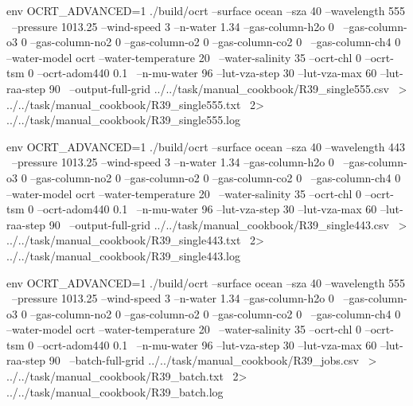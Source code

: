 \noindent\begin{minipage}{\linewidth}
\begin{ManualCode}

env OCRT_ADVANCED=1 ./build/ocrt --surface ocean --sza 40 --wavelength 555 \
  --pressure 1013.25 --wind-speed 3 --n-water 1.34 --gas-column-h2o 0 \
  --gas-column-o3 0 --gas-column-no2 0 --gas-column-o2 0 --gas-column-co2 0 \
  --gas-column-ch4 0 --water-model ocrt --water-temperature 20 \
  --water-salinity 35 --ocrt-chl 0 --ocrt-tsm 0 --ocrt-adom440 0.1 \
  --n-mu-water 96 --lut-vza-step 30 --lut-vza-max 60 --lut-raa-step 90 \
  --output-full-grid ../../task/manual_cookbook/R39_single555.csv \
  > ../../task/manual_cookbook/R39_single555.txt \
  2> ../../task/manual_cookbook/R39_single555.log

\end{ManualCode}
\end{minipage}\par

\noindent\begin{minipage}{\linewidth}
\begin{ManualCode}

env OCRT_ADVANCED=1 ./build/ocrt --surface ocean --sza 40 --wavelength 443 \
  --pressure 1013.25 --wind-speed 3 --n-water 1.34 --gas-column-h2o 0 \
  --gas-column-o3 0 --gas-column-no2 0 --gas-column-o2 0 --gas-column-co2 0 \
  --gas-column-ch4 0 --water-model ocrt --water-temperature 20 \
  --water-salinity 35 --ocrt-chl 0 --ocrt-tsm 0 --ocrt-adom440 0.1 \
  --n-mu-water 96 --lut-vza-step 30 --lut-vza-max 60 --lut-raa-step 90 \
  --output-full-grid ../../task/manual_cookbook/R39_single443.csv \
  > ../../task/manual_cookbook/R39_single443.txt \
  2> ../../task/manual_cookbook/R39_single443.log

\end{ManualCode}
\end{minipage}\par

\noindent\begin{minipage}{\linewidth}
\begin{ManualCode}

env OCRT_ADVANCED=1 ./build/ocrt --surface ocean --sza 40 --wavelength 555 \
  --pressure 1013.25 --wind-speed 3 --n-water 1.34 --gas-column-h2o 0 \
  --gas-column-o3 0 --gas-column-no2 0 --gas-column-o2 0 --gas-column-co2 0 \
  --gas-column-ch4 0 --water-model ocrt --water-temperature 20 \
  --water-salinity 35 --ocrt-chl 0 --ocrt-tsm 0 --ocrt-adom440 0.1 \
  --n-mu-water 96 --lut-vza-step 30 --lut-vza-max 60 --lut-raa-step 90 \
  --batch-full-grid ../../task/manual_cookbook/R39_jobs.csv \
  > ../../task/manual_cookbook/R39_batch.txt \
  2> ../../task/manual_cookbook/R39_batch.log

\end{ManualCode}
\end{minipage}\par


